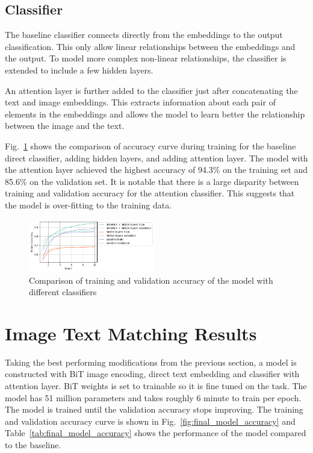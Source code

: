 \documentclass[conference]{IEEEtran}
\begin{document}
\subsection{Classifier}

The baseline classifier connects directly from the embeddings to the output classification. This only allow linear relationships between the embeddings and the output. To model more complex non-linear relationships, the classifier is extended to include a few hidden layers.

An attention layer is further added to the classifier just after concatenating the text and image embeddings. This extracts information about each pair of elements in the embeddings and allows the model to learn better the relationship between the image and the text.

Fig.~\ref{fig:classifier_comparison} shows the comparison of accuracy curve during training for the baseline direct classifier, adding hidden layers, and adding attention layer. The model with the attention layer achieved the highest accuracy of 94.3\% on the training set and 85.6\% on the validation set. It is notable that there is a large disparity between training and validation accuracy for the attention classifier. This suggests that the model is over-fitting to the training data.

\begin{figure}
    \centering
    \includegraphics[width=0.49\textwidth]{classifier_comparison.png}
    \caption{Comparison of training and validation accuracy of the model with different classifiers}
    \label{fig:classifier_comparison}
\end{figure}

\section{Image Text Matching Results}

Taking the best performing modifications from the previous section, a model is constructed with BiT image encoding, direct text embedding and classifier with attention layer. BiT weights is set to trainable so it is fine tuned on the task. The model has 51 million parameters and takes roughly 6 minute to train per epoch. The model is trained until the validation accuracy stops improving. The training and validation accuracy curve is shown in Fig.~\ref{fig:final_model_accuracy} and Table~\ref{tab:final_model_accuracy} shows the performance of the model compared to the baseline.
\end{document}
